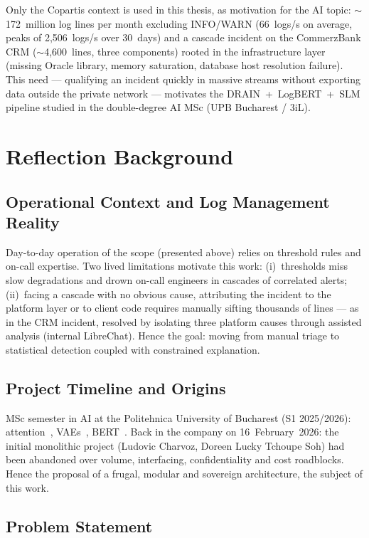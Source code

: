 \documentclass[12pt,a4paper]{report}
\begin{document}
Only the Copartis context is used in this thesis, as motivation for the AI topic: $\sim$172~million log lines per month excluding INFO/WARN (66~logs/s on average, peaks of 2,506~logs/s over 30~days) and a cascade incident on the CommerzBank CRM ($\sim$4,600~lines, three components) rooted in the infrastructure layer (missing Oracle library, memory saturation, database host resolution failure). This need --- qualifying an incident quickly in massive streams without exporting data outside the private network --- motivates the DRAIN~+~LogBERT~+~SLM pipeline studied in the double-degree AI MSc (UPB Bucharest / 3iL).

\section{Reflection Background}

\subsection{Operational Context and Log Management Reality}

Day-to-day operation of the scope (presented above) relies on threshold rules and on-call expertise. Two lived limitations motivate this work: (i)~thresholds miss slow degradations and drown on-call engineers in cascades of correlated alerts; (ii)~facing a cascade with no obvious cause, attributing the incident to the platform layer or to client code requires manually sifting thousands of lines --- as in the CRM incident, resolved by isolating three platform causes through assisted analysis (internal LibreChat). Hence the goal: moving from manual triage to statistical detection coupled with constrained explanation.

\subsection{Project Timeline and Origins}

MSc semester in AI at the Politehnica University of Bucharest (S1 2025/2026): attention~\cite{vaswani2017attention}, VAEs~\cite{kingma2013vae}, BERT~\cite{devlin2018bert}. Back in the company on 16~February~2026: the initial monolithic project (Ludovic Charvoz, Doreen Lucky Tchoupe Soh) had been abandoned over volume, interfacing, confidentiality and cost roadblocks. Hence the proposal of a frugal, modular and sovereign architecture, the subject of this work.

\subsection{Problem Statement}
\end{document}
